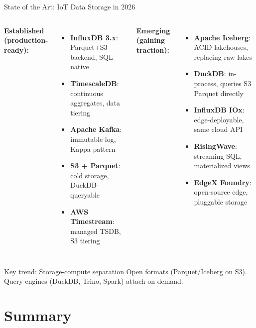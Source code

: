 \documentclass[aspectratio=169,11pt]{beamer}
\begin{document}
\begin{frame}{State of the Art: IoT Data Storage in 2026}
    \small
    \begin{columns}
        \textbf{Established (production-ready):}
        \begin{itemize}\setlength{\itemsep}{0pt}
            \item \textbf{InfluxDB 3.x}: Parquet+S3 backend, SQL native
            \item \textbf{TimescaleDB}: continuous aggregates, data tiering
            \item \textbf{Apache Kafka}: immutable log, Kappa pattern
            \item \textbf{S3 + Parquet}: cold storage, DuckDB-queryable
            \item \textbf{AWS Timestream}: managed TSDB, S3 tiering
        \end{itemize}

        \textbf{Emerging (gaining traction):}
        \begin{itemize}\setlength{\itemsep}{0pt}
            \item \textbf{Apache Iceberg}: ACID lakehouses, replacing raw lakes
            \item \textbf{DuckDB}: in-process, queries S3 Parquet directly
            \item \textbf{InfluxDB IOx}: edge-deployable, same cloud API
            \item \textbf{RisingWave}: streaming SQL, materialized views
            \item \textbf{EdgeX Foundry}: open-source edge, pluggable storage
        \end{itemize}
    \end{columns}

    \vspace{0.05cm}
    \begin{alertblock}{Key trend: Storage-compute separation}
        Open formats (Parquet/Iceberg on S3). Query engines (DuckDB, Trino, Spark) attach on demand.
    \end{alertblock}
\end{frame}

\section{Summary}
\end{document}
